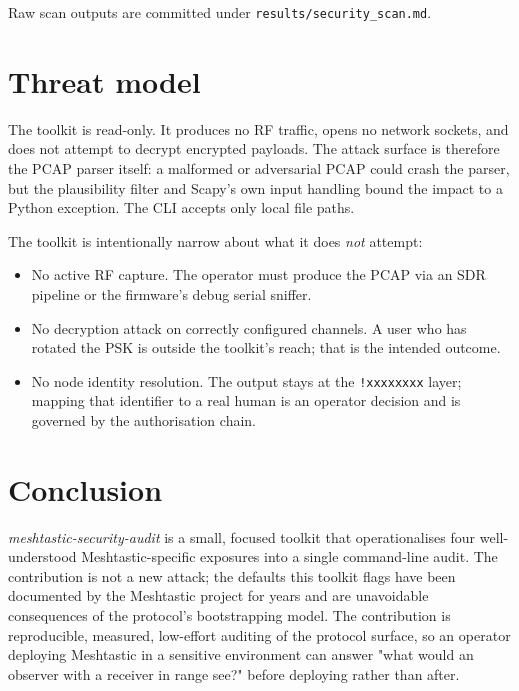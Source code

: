 \documentclass[conference,a4paper,10pt]{IEEEtran}
\begin{document}
Raw scan outputs are committed under \texttt{results/security\_scan.md}.

\section{Threat model}

The toolkit is read-only. It produces no RF traffic, opens no network
sockets, and does not attempt to decrypt encrypted payloads. The
attack surface is therefore the PCAP parser itself: a malformed or
adversarial PCAP could crash the parser, but the plausibility filter
and Scapy's own input handling bound the impact to a Python
exception. The CLI accepts only local file paths.

The toolkit is intentionally narrow about what it does \emph{not}
attempt:

\begin{itemize}
  \item No active RF capture. The operator must produce the PCAP via
    an SDR pipeline or the firmware's debug serial sniffer.
  \item No decryption attack on correctly configured channels. A
    user who has rotated the PSK is outside the toolkit's reach;
    that is the intended outcome.
  \item No node identity resolution. The output stays at the
    \texttt{!xxxxxxxx} layer; mapping that identifier to a real
    human is an operator decision and is governed by the
    authorisation chain.
\end{itemize}

\section{Conclusion}

\emph{meshtastic-security-audit} is a small, focused toolkit that
operationalises four well-understood Meshtastic-specific exposures
into a single command-line audit. The contribution is not a new
attack; the defaults this toolkit flags have been documented by the
Meshtastic project for years \cite{meshtastic_docs} and are
unavoidable consequences of the protocol's bootstrapping model. The
contribution is reproducible, measured, low-effort auditing of the
protocol surface, so an operator deploying Meshtastic in a
sensitive environment can answer "what would an observer with a
receiver in range see?" before deploying rather than after.
\end{document}
